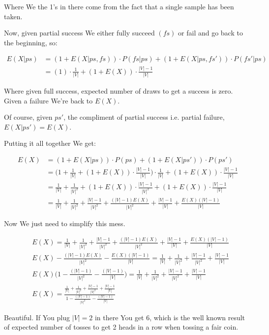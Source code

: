 \documentclass{article}
\begin{document}
	Where We the 1's in there come from the fact that a single sample has been taken.
	
	Now, given partial success We either fully succeed $(fs)$ or fail and go back to the beginning, so:
	
	\begin{align}
		E(X|ps) &= (1+E(X|ps, fs))\cdot P(fs|ps) + (1+E(X|ps, fs'))\cdot P(fs'|ps)\\
		&= (1)\cdot \frac{1}{|V|} + (1+E(X))\cdot \frac{|V|-1}{|V|}
	\end{align}
	
	Where given full success, expected number of draws to get a success is zero.  Given a failure We're back to $E(X)$.
	
	Of course, given $ps'$, the compliment of partial success i.e. partial failure, $E(X|ps') = E(X)$.
	
	Putting it all together We get:
	
	\begin{align}
		E(X) &= (1+E(X|ps))\cdot P(ps) + (1+E(X|ps'))\cdot P(ps')\\
		&= \bigg(1+\frac{1}{|V|} + (1+E(X))\cdot \frac{|V|-1}{|V|}\bigg)\cdot \frac{1}{|V|} + (1+E(X))\cdot \frac{|V| - 1}{|V|}\\
		&= \frac{1}{|V|}+\frac{1}{|V|^2} + (1+E(X))\cdot \frac{|V|-1}{|V|^2} + (1+E(X))\cdot \frac{|V|-1}{|V|}\\
		&= \frac{1}{|V|}+\frac{1}{|V|^2} + \frac{|V|-1}{|V|^2} + \frac{(|V|-1)E(X)}{|V|^2} + \frac{|V|-1}{|V|}+\frac{E(X)(|V|-1)}{|V|}
	\end{align}
	
	Now We just need to simplify this mess.
	
	\begin{align}
		&E(X) = \frac{1}{|V|}+\frac{1}{|V|^2} + \frac{|V|-1}{|V|^2} + \frac{(|V|-1)E(X)}{|V|^2} + \frac{|V|-1}{|V|}+\frac{E(X)(|V|-1)}{|V|}\\
		&E(X) - \frac{(|V|-1)E(X)}{|V|^2}-\frac{E(X)(|V|-1)}{|V|} = \frac{1}{|V|}+\frac{1}{|V|^2} + \frac{|V|-1}{|V|^2}  + \frac{|V|-1}{|V|}\\
		&E(X)\bigg(1 - \frac{(|V|-1)}{|V|^2}-\frac{(|V|-1)}{|V|}\bigg) = \frac{1}{|V|}+\frac{1}{|V|^2} + \frac{|V|-1}{|V|^2}  + \frac{|V|-1}{|V|}\\
		&E(X) = \frac{\frac{1}{|V|}+\frac{1}{|V|^2} + \frac{|V|-1}{|V|^2}  + \frac{|V|-1}{|V|}}{1 - \frac{(|V|-1)}{|V|^2}-\frac{(|V|-1)}{|V|}}
	\end{align}
	
	Beautiful. If You plug $|V|=2$ in there You get 6, which is the well known result of expected number of tosses to get 2 heads in a row when tossing a fair coin.
	
\end{document}
